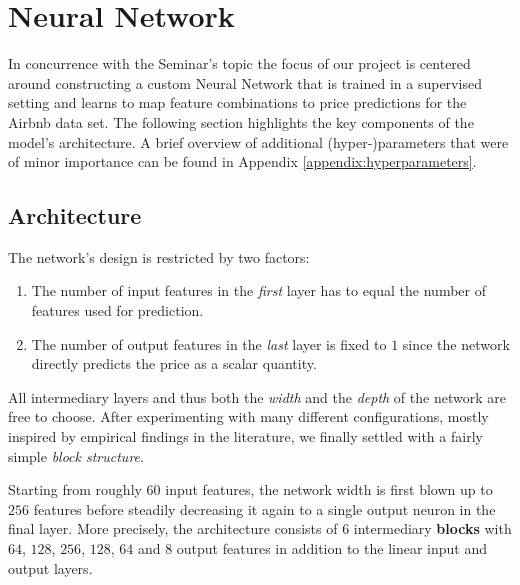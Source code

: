 \documentclass[12pt, letterpaper]{article}
\begin{document}
\section{Neural Network} \label{neural-network}

In concurrence with the Seminar's topic the focus of our project is centered around constructing a custom Neural Network that is trained in a supervised setting and learns to map feature combinations to price predictions for the Airbnb data set.
The following section highlights the key components of the model's architecture.
A brief overview of additional (hyper-)parameters that were of minor importance can be found in Appendix \ref{appendix:hyperparameters}.

\subsection{Architecture}

The network's design is restricted by two factors:
\begin{enumerate}
    \item The number of input features in the \emph{first} layer has to equal the number of features used for prediction.
    \item The number of output features in the \emph{last} layer is fixed to $1$ since the network directly predicts the price as a scalar quantity.
\end{enumerate}
All intermediary layers and thus both the \emph{width} and the \emph{depth} of the network are free to choose.
After experimenting with many different configurations, mostly inspired by empirical findings in the literature, we finally settled with a fairly simple \emph{block structure}.

Starting from roughly $60$ input features, the network width is first blown up to $256$ features before steadily decreasing it again to a single output neuron in the final layer.
More precisely, the architecture consists of $6$ intermediary \textbf{blocks} with $64$, $128$, $256$, $128$, $64$ and $8$ output features in addition to the linear input and output layers.
\end{document}
